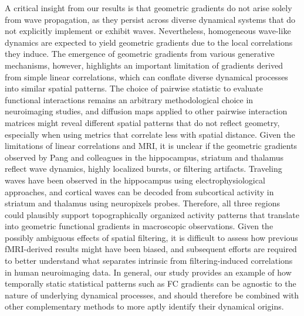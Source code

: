 \documentclass{article}
\begin{document}
A critical insight from our results is that geometric gradients do not arise solely from wave propagation, as they persist across diverse dynamical systems that do not explicitly implement or exhibit waves. Nevertheless, homogeneous wave-like dynamics are expected to yield geometric gradients due to the local correlations they induce\cite{ackman2012retinal}. The emergence of geometric gradients from various generative mechanisms, however, highlights an important limitation of gradients derived from simple linear correlations, which can conflate diverse dynamical processes into similar spatial patterns. The choice of pairwise statistic to evaluate functional interactions remains an arbitrary methodological choice in neuroimaging studies, and diffusion maps applied to other pairwise interaction matrices might reveal different spatial patterns that do not reflect geometry, especially when using metrics that correlate less with spatial distance\cite{liu2024benchmarking}. Given the limitations of linear correlations and MRI, it is unclear if the geometric gradients observed by Pang and colleagues\cite{pang2023geometric} in the hippocampus, striatum and thalamus reflect wave dynamics, highly localized bursts, or filtering artifacts. Traveling waves have been observed in the hippocampus using electrophysiological approaches\cite{lubenov2009hippocampal, patel2012traveling}, and cortical waves can be decoded from subcortical activity in striatum and thalamus using neuropixels probes\cite{ye2023brain}. Therefore, all three regions could plausibly support topographically organized activity patterns that translate into geometric functional gradients in macroscopic observations. Given the possibly ambiguous effects of spatial filtering, it is difficult to assess how previous fMRI-derived results might have been biased, and subsequent efforts are required to better understand what separates intrinsic from filtering-induced correlations in human neuroimaging data. In general, our study provides an example of how temporally static statistical patterns such as FC gradients can be agnostic to the nature of underlying dynamical processes, and should therefore be combined with other complementary methods to more aptly identify their dynamical origins. 
\end{document}
